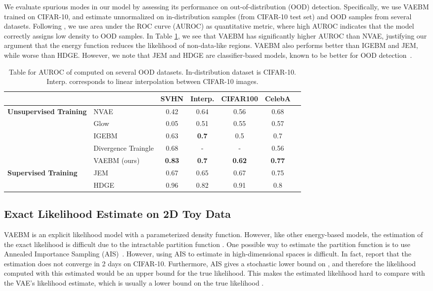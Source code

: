 \documentclass{article} \usepackage{iclr2021_conference,times}
\begin{document}
We evaluate spurious modes in our model by assessing its performance on out-of-distribution (OOD) detection. Specifically, we use VAEBM trained on CIFAR-10, and estimate unnormalized  on in-distribution samples (from CIFAR-10 test set) and OOD samples from several datasets. Following \citet{nalisnick2018deep}, we use area under the ROC curve (AUROC) as quantitative metric, where high AUROC indicates that the model correctly assigns low density to OOD samples. In Table \ref{table ood}, we see that VAEBM has significantly higher AUROC than NVAE, justifying our argument that the energy function reduces the likelihood of non-data-like regions. VAEBM also performs better than IGEBM and JEM, while worse than HDGE. However, we note that JEM and HDGE are classifier-based models, known to be better for OOD detection~\citep{liang2017enhancing}. 

\begin{table}[ht]
\small
\caption{Table for AUROC of  computed on several OOD datasets. In-distribution dataset is CIFAR-10. Interp. corresponds to linear interpolation between CIFAR-10 images.}
\label{table ood}
\centering
\begin{tabular}{llccccc}
& & SVHN & Interp. &CIFAR100 & CelebA
\\ \hline
\multirow{5}{2cm}{\textbf{Unsupervised Training}}&NVAE \citep{vahdat2020nvae} & 0.42 & 0.64&  0.56 & 0.68\\
&Glow \citep{kingma2018glow} & 0.05 & 0.51& 0.55 & 0.57 \\
&IGEBM \citep{du2019implicit} & 0.63 & \textbf{0.7} & 0.5 & 0.7\\
&Divergence Traingle \citep{han2020joint}& 0.68& -&- &0.56\\ 
&VAEBM (ours) & \textbf{0.83} & \textbf{0.7} & \textbf{0.62} & \textbf{0.77}\\ 
\hline
\hline
\multirow{2}{2cm}{\textbf{Supervised Training}}&JEM \citep{grathwohl2020your} & 0.67 &0.65 &0.67 & 0.75\\
&HDGE \citep{liu2020hybrid} & 0.96 & 0.82 &0.91 & 0.8\\
\hline
\end{tabular}
\end{table}


\subsection{Exact Likelihood Estimate on 2D Toy Data}
VAEBM is an explicit likelihood model with a parameterized density function. However, like other energy-based models, the estimation of the exact likelihood is difficult due to the intractable partition function . One possible way to estimate the partition function is to use Annealed Importance Sampling (AIS)~\citep{neal2001annealed}. However, using AIS to estimate  in high-dimensional spaces is difficult. In fact, \citet{du2019implicit} report that the estimation does not converge in 2 days on CIFAR-10. Furthermore, AIS gives a stochastic lower bound on , and therefore the likelihood computed with this estimated  would be an upper bound for the true likelihood. This makes the estimated likelihood hard to compare with the VAE's likelihood estimate, which is usually a lower bound on the true likelihood \citep{burda2015importance}.
\end{document}

